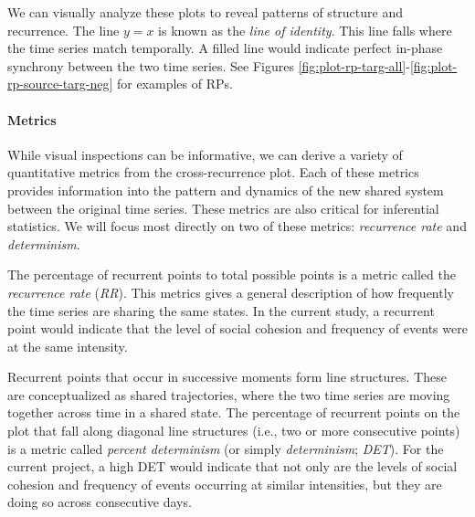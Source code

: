 \documentclass[english,man]{apa6}
\begin{document}
We can visually analyze these plots
to reveal patterns of structure and recurrence. The line \(y = x\) is known
as the \emph{line of identity}. This line falls where the time series match
temporally. A filled line would indicate perfect in-phase synchrony between the
two time series. See
Figures \ref{fig:plot-rp-targ-all}-\ref{fig:plot-rp-source-targ-neg}
for examples of RPs.

\hypertarget{metrics}{%
\paragraph{Metrics}\label{metrics}}

While visual inspections can be informative, we can derive a variety of
quantitative metrics from the cross-recurrence plot. Each of these metrics
provides information into the pattern and dynamics of the new shared system
between the original time series. These metrics are also critical for inferential
statistics. We will focus most directly on two of these metrics:
\emph{recurrence rate} and \emph{determinism}.

The percentage of recurrent points to total possible points is a metric
called the \emph{recurrence rate} (\emph{RR}). This metrics gives a general description of
how frequently the time series are sharing the same states. In the current
study, a recurrent point would indicate that the level of social cohesion
and frequency of events were at the same intensity.

Recurrent points that occur in successive moments form line structures.
These are conceptualized as shared trajectories, where the two time series
are moving together across time in a shared state. The percentage of
recurrent points on the plot that fall along diagonal line structures
(i.e., two or more
consecutive points) is a metric called \emph{percent determinism}
(or simply \emph{determinism}; \emph{DET}). For the
current project, a high DET would indicate that not only are the levels of
social cohesion and frequency of events occurring at similar intensities,
but they are doing so across consecutive days.
\end{document}
